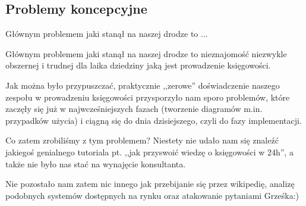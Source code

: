\documentclass{beamer}
\begin{document}
\subsection{Problemy koncepcyjne}
  \begin{frame}
    \begin{block}{}
      Głównym problemem jaki stanął na naszej drodze to ...
    \end{block}
  \end{frame}
  \begin{frame}
    \begin{block}{}
      Głównym problemem jaki stanął na naszej drodze to nieznajomość niezwykle obszernej i trudnej dla laika dziedziny jaką jest prowadzenie księgowości.
    \end{block}
  \end{frame}
  \begin{frame}
    \begin{block}{}
      Jak można było przypuszczać, praktycznie ,,zerowe'' doświadczenie naszego zespołu w prowadzeniu księgowości przysporzyło nam sporo problemów, które zaczęły się już w najwcześniejszych fazach (tworzenie diagramów m.in. przypadków użycia) i ciągną się do dnia dzisiejszego, czyli do fazy implementacji.
    \end{block}
  \end{frame}
  \begin{frame}
    \begin{block}{}
      Co zatem zrobiliśmy z tym problemem? Niestety nie udało nam się znaleźć jakiegoś genialnego tutoriala pt. ,,jak przyswoić wiedzę o księgowości w 24h'', a także nie było nas stać na wynajęcie konsultanta.
    \end{block}
  \end{frame}
  \begin{frame}
    \begin{block}{}
      Nie pozostało nam zatem nic innego jak przebijanie się przez wikipedię, analizę podobnych systemów dostępnych na rynku oraz atakowanie pytaniami Grześka:)
    \end{block}
  \end{frame}
\end{document}
